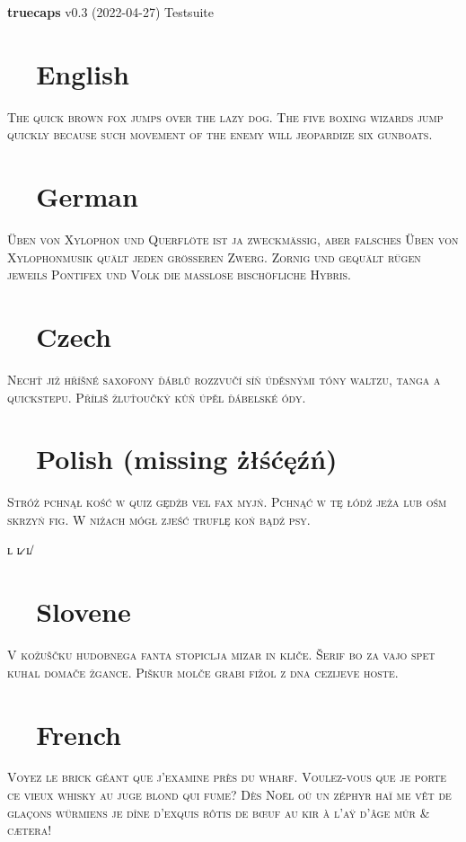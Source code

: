 \documentclass{article}
\def\checkno	{\textcolor{red}{\textbf{\ding{55}~~}}}
\def\checkyes	{\textcolor{green}{\textbf{\ding{51}~~}}}
\begin{document}
\hfill{\Large \textbf{truecaps} v0.3 (2022-04-27) Testsuite}

\vspace{-1em}\section*{\checkyes English}
\textsc{The quick brown fox jumps over the lazy dog.
The five boxing wizards jump quickly because such movement 
of the enemy will jeopardize six gunboats.}

\vspace{-1em}\section*{\checkyes German}
\noindent\textsc{Üben von Xylophon und Querflöte ist ja zweckmäßig, 
aber falsches Üben von Xylophonmusik quält jeden größeren Zwerg.
Zornig und gequält rügen jeweils Pontifex und Volk die maßlose bischöfliche Hybris.}

\vspace{-1em}\section*{\checkyes Czech}
\noindent\textsc{Nechť již hříšné saxofony ďáblů rozzvučí síň úděsnými 
tóny waltzu, tanga a quickstepu. Příliš žluťoučký kůň úpěl ďábelské ódy.}

\vspace{-1em}\section*{\checkno Polish (missing \string żłśćęźń)}
\noindent\textsc{
Stróż pchnął kość w quiz gędźb vel fax myjń. 
Pchnąć w tę łódź jeża lub ośm skrzyń fig.
W niżach mógł zjeść truflę koń bądź psy.
}

\noindent{} ʟ ʟ̷ ʟ̸

\vspace{-1em}\section*{\checkyes Slovene}
\noindent\textsc{
V kožuščku hudobnega fanta stopiclja mizar in kliče.
Šerif bo za vajo spet kuhal domače žgance.
Piškur molče grabi fižol z dna cezijeve hoste.}

\vspace{-1em}\section*{\checkyes French}
\noindent\textsc{Voyez le brick géant que j’examine près du wharf.
Voulez-vous que je porte ce vieux whisky au juge blond qui fume\medspace?
Dès Noël où un zéphyr haï me vêt de glaçons würmiens 
je dîne d’exquis rôtis de bœuf au kir à l’aÿ d’âge mûr \& cætera\medspace!}
\end{document}
